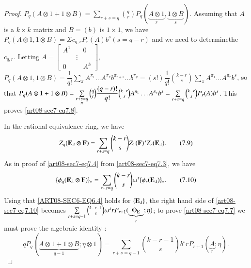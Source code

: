 \begin{proof}
$P_{q}(A\otimes 1+1\otimes B)=\sum\limits_{r+s=q}\binom{q}{r}P_{q}(\underbrace{A\otimes 1}_{r},\underbrace{1\otimes B}_{s})$. Assuming that $A$ is a $k\times k$ matrix and $B=(b)$ is $1\times 1$, we have $P_{q}(A\otimes 1,1\otimes B)=\Sigma c_{q,r}P_{r}(A)b^{s}(s=q-r)$ and we need to determine\pageoriginale the $c_{q,r}$. Letting $A=\left[\begin{smallmatrix} A^{1} & & 0\\  & \vdots &\\0 & & A^{k} \end{smallmatrix}\right]$, $P_{q}(A\otimes 1,1\otimes B)=\dfrac{1}{q!}\sum\limits_{\pi}A^{\pi_{1}}\ldots A^{\pi_{r}}b^{\pi_{r+1}}\ldots b^{\pi_{q}}=(s!)\dfrac{1}{q!}\binom{k-r}{s}\sum\limits_{\pi}A^{\pi_{1}}\ldots A^{\pi_{r}}b^{s}$, so that $P_{q}(A\otimes 1+1\otimes B)=\sum\limits_{\substack{r+s=q\\ \pi}}\break \binom{q}{r}\dfrac{(q-r)!}{q!}\binom{k-r}{s}A^{\pi_{1}}\ldots A^{\pi_{r}}b^{s}=\sum\limits_{r+s=q}\binom{k-r}{s}P_{r}(A)b^{s}$. This proves \eqref{art08-sec7-eq7.8}.

In the rational equivalence ring, we have
\begin{equation*}
Z_{q}(\mathbf{E}_{\lambda}\otimes \mathbf{F})=\sum\limits_{r+s=q}\binom{k-r}{s}Z_{1}(\mathbf{F})^{s}Z_{r}(\mathbf{E}_{\lambda}).\tag{7.9}\label{art08-sec7-eq7.9}
\end{equation*}
As in proof of \eqref{art08-sec7-eq7.4} from \eqref{art08-sec7-eq7.3}, we have
\begin{equation*}
\{\phi_{q}(\mathbf{E}_{\lambda}\otimes \mathbf{F})\}_{\ast}=\sum\limits_{r+s=q}\binom{k-r}{s}\omega^{s}\{\phi_{r}(\mathbf{E}_{\lambda})\}_{*}.\tag{7.10}\label{art08-sec7-eq7.10}
\end{equation*}
Using that \eqref{ART08-SEC6-EQ6.4} holds for $\{\mathbf{E}_{\lambda}\}$, the right hand side of \eqref{art08-sec7-eq7.10} becomes $\sum\limits_{r+s=q-1}\binom{k-r-1}{s}\omega^{s}rP_{r+1}(\underbrace{\Theta_{\mathbf{E}}}_{r};\eta)$; to prove \eqref{art08-sec7-eq7.7} we must prove the algebraic identity :
\begin{equation*}
qP_{q}(\underbrace{A\otimes 1+1\otimes B}_{q-1};\eta\otimes 1)=\sum\limits_{r+s=q-1}\binom{k-r-1}{s}b^{s}rP_{r+1}(\underbrace{A}_{r};\eta).\tag{7.11}\label{art08-sec7-eq7.11}
\end{equation*}
\end{proof}

